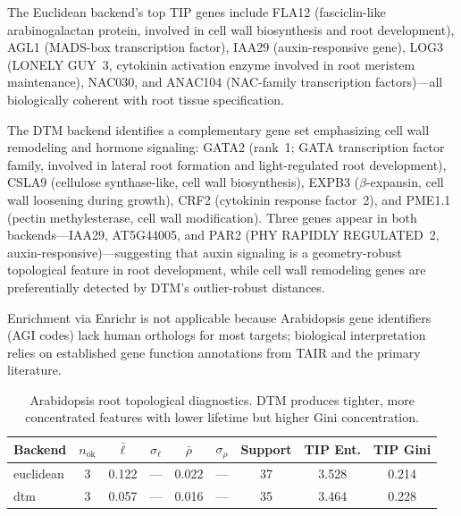 \documentclass[11pt]{article}
\begin{document}
The Euclidean backend's top TIP genes include FLA12 (fasciclin-like arabinogalactan protein, involved in cell wall biosynthesis and root development), AGL1 (MADS-box transcription factor), IAA29 (auxin-responsive gene), LOG3 (LONELY GUY~3, cytokinin activation enzyme involved in root meristem maintenance), NAC030, and ANAC104 (NAC-family transcription factors)---all biologically coherent with root tissue specification.

The DTM backend identifies a complementary gene set emphasizing cell wall remodeling and hormone signaling: GATA2 (rank~1; GATA transcription factor family, involved in lateral root formation and light-regulated root development), CSLA9 (cellulose synthase-like, cell wall biosynthesis), EXPB3 ($\beta$-expansin, cell wall loosening during growth), CRF2 (cytokinin response factor~2), and PME1.1 (pectin methylesterase, cell wall modification).
Three genes appear in both backends---IAA29, AT5G44005, and PAR2 (PHY RAPIDLY REGULATED~2, auxin-responsive)---suggesting that auxin signaling is a geometry-robust topological feature in root development, while cell wall remodeling genes are preferentially detected by DTM's outlier-robust distances.

Enrichment via Enrichr is not applicable because Arabidopsis gene identifiers (AGI codes) lack human orthologs for most targets; biological interpretation relies on established gene function annotations from TAIR and the primary literature.

\begin{table}[h]
\centering\small
\begin{tabular}{lcccccccc}
\toprule
Backend & $n_{\text{ok}}$ & $\bar{\ell}$ & $\sigma_\ell$ & $\bar{\rho}$ & $\sigma_\rho$ & Support & TIP Ent. & TIP Gini \\
\midrule
euclidean & 3 & 0.122 & --- & 0.022 & --- & 37 & 3.528 & 0.214 \\
dtm & 3 & 0.057 & --- & 0.016 & --- & 35 & 3.464 & 0.228 \\
\bottomrule
\end{tabular}
\caption{Arabidopsis root topological diagnostics. DTM produces tighter, more concentrated features with lower lifetime but higher Gini concentration.}
\label{tab:diag_arab}
\end{table}
\end{document}
